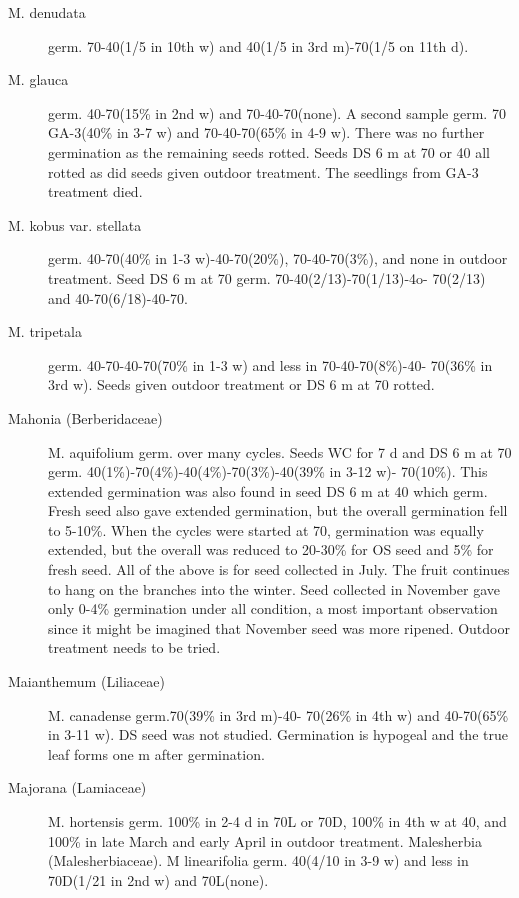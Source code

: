 \begin{description}
\item[M. denudata] germ. 70-40(1/5 in 10th w) and 40(1/5 in 3rd m)-70(1/5 on 11th d).
\item[M. glauca] germ. 40-70(15\% in 2nd w) and 70-40-70(none). A second sample
germ. 70 GA-3(40\% in 3-7 w) and 70-40-70(65\% in 4-9 w). There was no further
germination as the remaining seeds rotted. Seeds DS 6 m at 70 or 40 all rotted as did
seeds given outdoor treatment. The seedlings from GA-3 treatment died.
\item[M. kobus var. stellata] germ. 40-70(40\% in 1-3 w)-40-70(20\%), 70-40-70(3\%),
and none in outdoor treatment. Seed DS 6 m at 70 germ. 70-40(2/13)-70(1/13)-4o-
70(2/13) and 40-70(6/18)-40-70.
\item[M. tripetala] germ. 40-70-40-70(70\% in 1-3 w) and less in 70-40-70(8\%)-40-
70(36\% in 3rd w). Seeds given outdoor treatment or DS 6 m at 70 rotted.

\item[Mahonia (Berberidaceae)] M. aquifolium germ. over many cycles. Seeds
WC for 7 d and DS 6 m at 70 germ. 40(1\%)-70(4\%)-40(4\%)-70(3\%)-40(39\% in 3-12 w)-
70(10\%). This extended germination was also found in seed DS 6 m at 40 which
germ. Fresh seed also gave
extended germination, but the overall germination fell to 5-10\%. When the cycles
were started at 70, germination was equally extended, but the overall was reduced to
20-30\% for OS seed and 5\% for fresh seed. All of the above is for seed collected in
July. The fruit continues to hang on the branches into the winter. Seed collected in
November gave only 0-4\% germination under all condition, a most important
observation since it might be imagined that November seed was more ripened.
Outdoor treatment needs to be tried.

\item[Maianthemum (Liliaceae)] M. canadense germ.70(39\% in 3rd m)-40-
70(26\% in 4th w) and 40-70(65\% in 3-11 w). DS seed was not studied. Germination
is hypogeal and the true leaf forms one m after germination.

\item[Majorana (Lamiaceae)] M. hortensis germ. 100\% in 2-4 d in 70L or 70D,
100\% in 4th w at 40, and 100\% in late March and early April in outdoor treatment.
Malesherbia (Malesherbiaceae). M linearifolia germ. 40(4/10 in 3-9 w)
and less in 70D(1/21 in 2nd w) and 70L(none).


\end{description}
